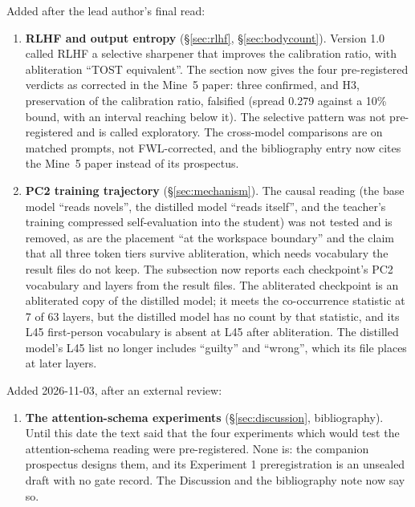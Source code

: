 \documentclass[11pt,a4paper]{article}
\begin{document}
\noindent Added after the lead author's final read:

\begin{enumerate}[nosep,leftmargin=*,resume]
\item \textbf{RLHF and output entropy} (\S\ref{sec:rlhf},
  \S\ref{sec:bodycount}). Version 1.0 called RLHF a selective sharpener
  that improves the calibration ratio, with abliteration ``TOST
  equivalent''. The section now gives the four pre-registered verdicts
  as corrected in the Mine~5 paper: three confirmed, and H3,
  preservation of the calibration ratio, falsified (spread 0.279 against
  a 10\% bound, with an interval reaching below it). The selective
  pattern was not pre-registered and is called exploratory. The
  cross-model comparisons are on matched prompts, not FWL-corrected, and
  the bibliography entry now cites the Mine~5 paper instead of its
  prospectus.
\item \textbf{PC2 training trajectory} (\S\ref{sec:mechanism}). The
  causal reading (the base model ``reads novels'', the distilled model
  ``reads itself'', and the teacher's training compressed
  self-evaluation into the student) was not tested and is removed, as
  are the placement ``at the workspace boundary'' and the claim that all
  three token tiers survive abliteration, which needs vocabulary the
  result files do not keep. The subsection now reports each
  checkpoint's PC2 vocabulary and layers from the result files. The
  abliterated checkpoint is an abliterated copy of the distilled model;
  it meets the co-occurrence statistic at 7 of 63 layers, but the
  distilled model has no count by that statistic, and its L45
  first-person vocabulary is absent at L45 after abliteration. The
  distilled model's L45 list no longer includes ``guilty'' and
  ``wrong'', which its file places at later layers.
\end{enumerate}

\noindent Added 2026-11-03, after an external review:

\begin{enumerate}[nosep,leftmargin=*,resume]
\item \textbf{The attention-schema experiments} (\S\ref{sec:discussion},
  bibliography). Until this date the text said that the four experiments
  which would test the attention-schema reading were pre-registered.
  None is: the companion prospectus designs them, and its Experiment 1
  preregistration is an unsealed draft with no gate record. The
  Discussion and the bibliography note now say so.
\end{enumerate}
\end{document}
